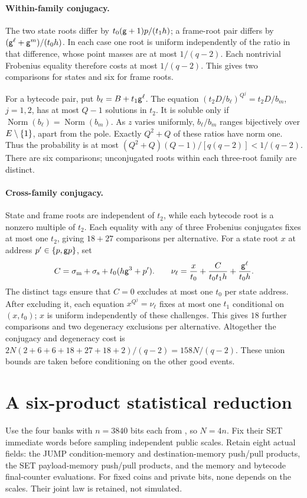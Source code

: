 \documentclass[11pt]{article}
\begin{document}
\paragraph{Within-family conjugacy.} The two state roots differ by $t_0(\mathsf{g}+1)p/(t_1h)$; a frame-root pair differs by $(\mathsf{g}^\ell+\mathsf{g}^m)/(t_0h)$. In each case one root is uniform independently of the ratio in that difference, whose point masses are at most $1/(q-2)$. Each nontrivial Frobenius equality therefore costs at most $1/(q-2)$. This gives two comparisons for states and six for frame roots.

For a bytecode pair, put $b_\ell=B+t_1\mathsf{g}^\ell$. The equation $(t_2D/b_\ell)^{Q^j}=t_2D/b_m$, $j=1,2$, has at most $Q-1$ solutions in $t_2$. It is soluble only if $\operatorname{Norm}(b_\ell)=\operatorname{Norm}(b_m)$. As $z$ varies uniformly, $b_\ell/b_m$ ranges bijectively over $E\setminus\{1\}$, apart from the pole. Exactly $Q^2+Q$ of these ratios have norm one. Thus the probability is at most $(Q^2+Q)(Q-1)/[q(q-2)]<1/(q-2)$. There are six comparisons; unconjugated roots within each three-root family are distinct.

\paragraph{Cross-family conjugacy.} State and frame roots are independent of $t_2$, while each bytecode root is a nonzero multiple of $t_2$. Each equality with any of three Frobenius conjugates fixes at most one $t_2$, giving $18+27$ comparisons per alternative. For a state root $x$ at address $p'\in\{p,\mathsf{g} p\}$, set
\[
 C=\sigma_{\rm m}+\sigma_{\rm s}+t_0(h\mathsf{g}^3+p').
 \qquad
 \nu_\ell=\frac{x}{t_0}+\frac{C}{t_0t_1h}+\frac{\mathsf{g}^\ell}{t_0h}.
\]
The distinct tags ensure that $C=0$ excludes at most one $t_0$ per state address. After excluding it, each equation $x^{Q^j}=\nu_\ell$ fixes at most one $t_1$ conditional on $(x,t_0)$; $x$ is uniform independently of these challenges. This gives $18$ further comparisons and two degeneracy exclusions per alternative. Altogether the conjugacy and degeneracy cost is $2N(2+6+6+18+27+18+2)/(q-2)=158N/(q-2)$. These union bounds are taken before conditioning on the other good events.

\section{A six-product statistical reduction}

Use the four banks with $n=3840$ bits each from , so $N=4n$. Fix their SET immediate words before sampling independent public scales. Retain eight actual fields: the JUMP condition-memory and destination-memory push/pull products, the SET payload-memory push/pull products, and the memory and bytecode final-counter evaluations. For fixed coins and private bits, none depends on the scales. Their joint law is retained, not simulated.
\end{document}
